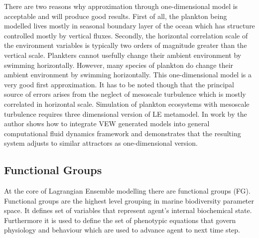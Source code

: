 \documentclass[12pt, a4paper]{report}
\begin{document}
There are two reasons why approximation through one-dimensional model is
acceptable and will produce good results. First of all, the plankton being
modelled lives mostly in seasonal boundary layer of the ocean which has structure
controlled mostly by vertical fluxes. Secondly, the horizontal correlation
scale of the environment variables is typically two orders of magnitude greater
than the vertical scale. Plankters cannot usefully change their ambient environment
by swimming horizontally. However, many species of plankton do change their
ambient environment by swimming horizontally. This one-dimensional model is a very
good first approximation. It has to be noted though that the principal source
of errors arises from the neglect of mesoscale turbulence which is mostly correlated
in horizontal scale. Simulation of plankton ecosystems with mesoscale turbulence
requires three dimensional version of LE metamodel. In work by \cite{FluidityVEW}
the author shows how to integrate VEW generated models into general computational
fluid dynamics framework and demonstrates that the resulting system adjusts to
similar attractors as one-dimensional version.

\subsection{Functional Groups}\label{subsec:fg}

At the core of Lagrangian Ensemble modelling there are functional groups (FG).
Functional groups are the highest level grouping in marine biodiversity
parameter space. It defines set of variables that represent agent's internal
biochemical state. Furthermore it is used to define the set of phenotypic
equations that govern physiology and behaviour which are used to advance
agent to next time step.
\end{document}
